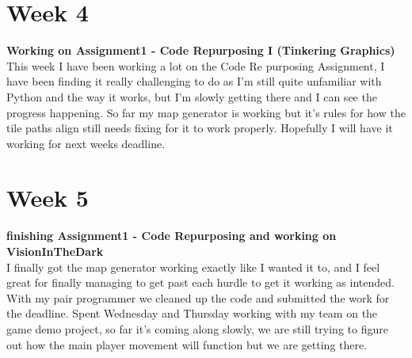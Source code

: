 \documentclass[11pt]{article}
\begin{document}
{\section*{Week 4}
{\small \textbf{Working on Assignment1 - Code Repurposing I (Tinkering Graphics)}}\\
This week I have been working a lot on the Code Re purposing Assignment, I have been finding it really challenging to do as I'm still quite unfamiliar with Python and the way it works, but I'm slowly getting there and I can see the progress happening. So far my map generator is working but it's rules for how the tile paths align still needs fixing for it to work properly. Hopefully I will have it working for next weeks deadline.
}

{\section*{Week 5}
{\small \textbf{finishing Assignment1 - Code Repurposing and working on VisionInTheDark}}\\
I finally got the map generator working exactly like I wanted it to, and I feel great for finally managing to get past each hurdle to get it working as intended. With my pair programmer we cleaned up the code and submitted the work for the deadline. Spent Wednesday and Thursday working with my team on the game demo project, so far it's coming along slowly, we are still trying to figure out how the main player movement will function but we are getting there.
}
\end{document}
